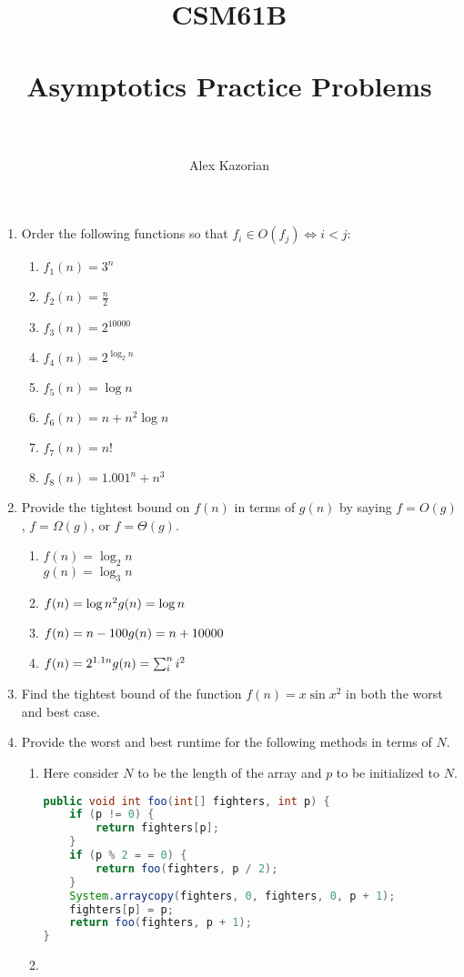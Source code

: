 \documentclass{article}
\title{
	\normalfont \normalsize
	\textsc{CSM61B} \\ [25pt] %
	\horrule{0.5pt} \\[0.4cm] %
	\huge Asymptotics Practice Problems \\ %
	\horrule{2pt} \\[0.5cm] %
}
\author{Alex Kazorian} %
\newenvironment{Questions}[1][Question]
{\begin{enumerate}}
	{\end{enumerate}}
\newcommand{\Question}{\item }
\begin{document}
	\maketitle
	\begin{Questions}
	    \Question
        Order the following functions so that $f_i \in O(f_j) \Longleftrightarrow i < j$:
            \begin{enumerate}
                \item $f_1(n) = 3^n$
                \item $f_2(n) = \frac n 2$
                \item $f_3(n) = 2^{10000}$
                \item $f_4(n) = 2^{\log_2 n}$
                \item $f_5(n) = \log n$
                \item $f_6(n) = n + n^2 \log n$
                \item $f_7(n) = n!$
                \item $f_8(n) = 1.001^n + n^3$
            \end{enumerate}

        \Question
        Provide the tightest bound on $f(n)$ in terms of $g(n)$ by saying $f = O(g)$, $f = \Omega(g)$, or $f = \Theta(g)$.
            \begin{enumerate}
                \item $f(n) = \log_2 n$ \\
                      $g(n) = \log_3 n$
                \item $f(n) = \log n^2 \\
                       g(n) = \log n$
                \item $f(n) = n - 100 \\
                       g(n) = n + 10000$
                \item $f(n) = 2^{1.1n} \\
                       g(n) = \sum_i^n i^2$
            \end{enumerate}

        \Question
        Find the tightest bound of the function $f(n) = x \sin x^2$ in both the worst and best case.

        \Question
		Provide the worst and best runtime for the following methods in terms of $N$.
			\begin{enumerate}
				\item
				Here consider $N$ to be the length of the array and $p$ to be initialized to $N$.
				\begin{lstlisting}[language=Java]
public void int foo(int[] fighters, int p) {
	if (p != 0) {
		return fighters[p];
	}
	if (p % 2 = = 0) {
		return foo(fighters, p / 2);
	}
	System.arraycopy(fighters, 0, fighters, 0, p + 1);
	fighters[p] = p;
	return foo(fighters, p + 1);
}
			\end{lstlisting}
				\item


			\end{enumerate}

	\end{Questions}
\end{document}
